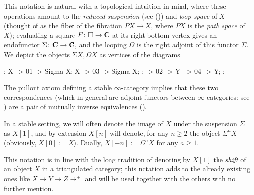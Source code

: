 This notation is natural with a topological intuition in mind, where these operations amount to the \emph{reduced suspension} (see ()) and \emph{loop space} of $X$ (thought of as the fiber of the fibration $PX \to X$, where $PX$ is the \emph{path space} of $X$); evaluating a square $F\colon \square\to \mathbf{C}$ at its right\hyp{}bottom vertex gives an endofunctor $\Sigma\colon \mathbf{C}\to \mathbf{C}$, and the looping $\Omega$ is the right adjoint of this functor $\Sigma$. We depict the objects $\Sigma X, \Omega X$ as vertices of the diagrams
\begin{center}
\begin{kD}
;
\mor X -> 01 -> {Sigma X};
\mor X -> 03 -> {Sigma X};
;
 -> 02 -> Y;
 -> 04 -> Y;
;
\end{kD}
\end{center}
The pullout axiom defining a stable $\infty$\hyp{}category implies that these two correspondences (which in general are adjoint functors between $\infty$\hyp{}categories: see \cite[Remark \textbf{1.1.2.8}]{LurieHA}) are a pair of mutually inverse equivalences (\cite[Prop. \textbf{5.8}]{Gro}).
\begin{notat}\label{shifteggio}
In a stable setting, we will often denote the image of $X$ under the suspension $\Sigma$ as $X[1]$, and by extension $X[n]$ will denote, for any $n\ge 2$ the object $\Sigma^nX$ (obviously, $X[0]:=X$). Dually, $X[-n]:=\Omega^n X$ for any $n\ge 1$.
\end{notat}
This notation is in line with the long tradition of denoting by $X[1]$ the \emph{shift} of an object $X$ in a triangulated category; this notation adds to the already existing ones like $X\to Y\to Z\to^+$ and will be used together with the others with no further mention.
